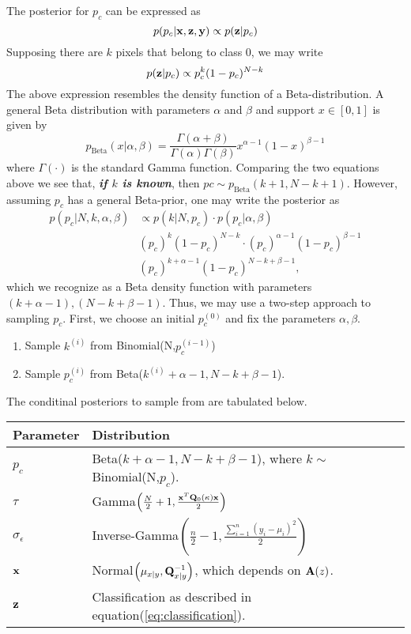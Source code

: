 \documentclass[a4paper,10pt]{article}
\def\bA{{\bf A}}
\def\bQ{{\bf Q}}
\def\bx{{\bf x}}
\def\by{{\bf y}}
\def\bz{{\bf z}}
\def\sigmaeps{{\sigma_{\epsilon}}}
\begin{document}
The posterior for $p_c$ can be expressed as
\begin{equation}
 p(p_c | \bx, \bz, \by) \propto p(\bz | p_c)
\end{equation}
Supposing there are $k$ pixels that belong to class 0, we may write
\begin{equation}
 p(\bz | p_c) \propto p_c^k (1 - p_c)^{N-k}
\end{equation}
The above expression resembles the density function of a Beta-distribution. A general Beta distribution with parameters $\alpha$ and $\beta$ and support $x \in [0,1]$ is given by
\begin{equation}
 p_{\mathrm{Beta}}(x|\alpha,\beta) = \frac{\Gamma(\alpha+\beta)}{\Gamma(\alpha) \Gamma(\beta)} x^{\alpha-1} (1-x)^{\beta-1}
\end{equation}
where $\Gamma(\cdot)$ is the standard Gamma function. Comparing the two equations above we see that, {\bf{\em if $k$ is known}}, then $pc \sim p_{\mathrm{Beta}}(k+1, N-k+1)$. However, assuming $p_c$ has a general Beta-prior, one may write the posterior as
\begin{align}
 p(p_c|N,k,\alpha,\beta) &\propto p(k|N,p_c)\cdot p(p_c | \alpha, \beta) \nonumber \\
 & (p_c)^k (1-p_c)^{N-k} \cdot (p_c)^{\alpha-1} (1-p_c)^{\beta-1} \nonumber \\
 & (p_c)^{k+\alpha-1} (1-p_c)^{N-k+\beta-1},
\end{align}
which we recognize as a Beta density function with parameters  $(k+\alpha-1), (N-k+\beta-1)$.
Thus, we may use a two-step approach to sampling $p_c$. First, we choose an initial $p_c^{(0)}$ and fix the parameters $\alpha,\beta$.
\begin{enumerate}
 \item Sample $k^{(i)}$ from Binomial(N,$p_c^{(i-1)}$)
 \item Sample $p_c^{(i)}$ from Beta($k^{(i)}+\alpha-1, N-k+\beta-1$). 
\end{enumerate}

The conditinal posteriors to sample from are tabulated below.
\begin{table}[H]
\centering
\begin{tabular}{lp{9cm}}
\hline
{\bf Parameter} & {\bf Distribution} \\
\hline
$p_c$ & Beta($k+\alpha-1, N-k+\beta-1$), where $k \sim $ Binomial(N,$p_c$).\\
$\tau$ & Gamma$\left( \frac{N}{2} + 1, \frac{\bx^T \bQ_0(\kappa) \bx}{2}  \right)$ \\
$\sigmaeps$ & Inverse-Gamma$\left( \frac{n}{2}-1, \frac{\sum_{i=1}^n(y_i - \mu_i)^2}{2} \right)$ \\
$\bx$ & Normal$\left( \mu_{x|y}, \bQ_{x|y}^{-1}\right)$, which depends on $\bA(z)$.\\
$\bz$ & Classification as described in equation(\ref{eq:classification}). \\
\hline
\end{tabular}
\end{table}
\end{document}
